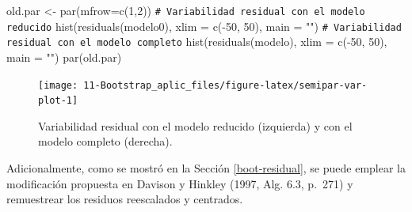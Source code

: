 \documentclass[
]{book}
\newenvironment{Shaded}{\begin{snugshade}}{\end{snugshade}}
\newcommand{\AttributeTok}[1]{\textcolor[rgb]{0.77,0.63,0.00}{#1}}
\newcommand{\CommentTok}[1]{\textcolor[rgb]{0.56,0.35,0.01}{\textit{#1}}}
\newcommand{\DecValTok}[1]{\textcolor[rgb]{0.00,0.00,0.81}{#1}}
\newcommand{\FunctionTok}[1]{\textcolor[rgb]{0.00,0.00,0.00}{#1}}
\newcommand{\NormalTok}[1]{#1}
\newcommand{\OtherTok}[1]{\textcolor[rgb]{0.56,0.35,0.01}{#1}}
\newcommand{\SpecialCharTok}[1]{\textcolor[rgb]{0.00,0.00,0.00}{#1}}
\newcommand{\StringTok}[1]{\textcolor[rgb]{0.31,0.60,0.02}{#1}}
\theoremstyle{break}
\theoremstyle{nonumberplain}
\renewcommand{\CommentTok}[1]{\textcolor[rgb]{0.41,0.41,0.41}{\texttt{#1}}}
\begin{document}
\begin{Shaded}
\begin{Highlighting}[]
\NormalTok{old.par }\OtherTok{\textless{}{-}} \FunctionTok{par}\NormalTok{(}\AttributeTok{mfrow=}\FunctionTok{c}\NormalTok{(}\DecValTok{1}\NormalTok{,}\DecValTok{2}\NormalTok{))}
\CommentTok{\# Variabilidad residual con el modelo reducido}
\FunctionTok{hist}\NormalTok{(}\FunctionTok{residuals}\NormalTok{(modelo0), }\AttributeTok{xlim =} \FunctionTok{c}\NormalTok{(}\SpecialCharTok{{-}}\DecValTok{50}\NormalTok{, }\DecValTok{50}\NormalTok{), }\AttributeTok{main =} \StringTok{""}\NormalTok{)}
\CommentTok{\# Variabilidad residual con el modelo completo}
\FunctionTok{hist}\NormalTok{(}\FunctionTok{residuals}\NormalTok{(modelo), }\AttributeTok{xlim =} \FunctionTok{c}\NormalTok{(}\SpecialCharTok{{-}}\DecValTok{50}\NormalTok{, }\DecValTok{50}\NormalTok{), }\AttributeTok{main =} \StringTok{""}\NormalTok{)}
\FunctionTok{par}\NormalTok{(old.par)}
\end{Highlighting}
\end{Shaded}

\begin{figure}[!htb]

{\centering \texttt{[image: 11-Bootstrap\_aplic\_files/figure-latex/semipar-var-plot-1]} 

}

\caption{Variabilidad residual con el modelo reducido (izquierda) y con el modelo completo (derecha).}\label{fig:semipar-var-plot}
\end{figure}

Adicionalmente, como se mostró en la Sección \ref{boot-residual}, se puede emplear
la modificación propuesta en Davison y Hinkley (1997, Alg. 6.3, p.~271)
y remuestrear los residuos reescalados y centrados.
\end{document}
